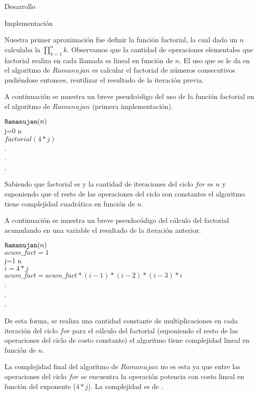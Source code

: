 \begin{section}{Desarrollo}
\begin{subsection}{Implementación}
\begin{itemize}
		Nuestra primer aproximación fue definir la función factorial, la cual dado un $n$ calculaba la $\prod_{k=1}^{n}{k}$. Observamos que la cantidad de operaciones elementales que factorial realiza en cada llamada es lineal en función de $n$. El uso que se le da en el algoritmo de $Ramanujan$ es calcular el factorial de números consecutivos pudiéndose entonces, reutilizar el resultado de la iteración previa.\VSP
		
		A continuación se muestra un breve pseudcódigo del uso de la función factorial en el algoritmo de $Ramanujan$ (primera implementación).
		
		$\texttt{Ramanujan}(n)$\\
		\tab\FOR j=0 \TO n\\
		\tab\tab$factorial(4*j)$\\
		\tab\tab\tab.\\
		\tab\tab\tab.\\
		\tab\tab\tab.\\
		\tab\END
		
		\VSP
		
		Sabiendo que factorial es  y la cantidad de iteraciones del ciclo $for$ es $n$ y suponiendo que el resto de las operaciones del ciclo son constantes el algoritmo tiene complejidad cuadrática en función de $n$.\VSP

		A continuación se muestra un breve pseudocódigo del cálculo del factorial acumulando en una variable el resultado de la iteración anterior.\VSP
		
		$\texttt{Ramanujan}(n)$\\
		\tab $acum\_fact=1$\\
		\tab\FOR j=1 \TO n\\
		\tab\tab $i = 4*j$\\
		\tab\tab$acum\_fact = acum\_fact*(i-1)*(i-2)*(i-3)*i$\\
		\tab\tab\tab.\\
		\tab\tab\tab.\\
		\tab\tab\tab.\\
		\tab\END
		
		\VSP
		
		De esta forma, se realiza una cantidad constante de multiplicaciones en cada iteración del ciclo $for$ para el cálculo del factorial (suponiendo el resto de las operaciones del ciclo de costo constante) el algoritmo tiene complejidad lineal en función de $n$.
		
		La complejidad final del algoritmo de $Ramanujan$ no es esta ya que entre las operaciones del ciclo $for$ se encuentra la operación potencia con costo lineal en función del exponente ($4*j$). La complejidad es de .
		

\end{itemize}
\end{subsection}
\end{section}
